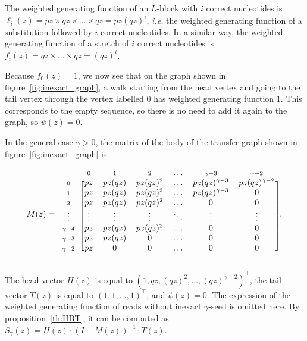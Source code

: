 \documentclass{article}
\begin{document}
The weighted generating function of an $L$-block with $i$ correct
nucleotides is $\ell_i(z) = pz \times qz \times \ldots \times qz =
pz(qz)^i$, \textit{i.e.} the weighted generating function of a
substitution followed by $i$ correct nucleotides. In a similar way, the
weighted generating function of a stretch of $i$ correct nucleotides is
$f_i(z) = qz \times \ldots \times qz = (qz)^i$.

Because $f_0(z) = 1$, we now see that on the graph shown in
figure~\ref{fig:inexact_graph}, a walk starting from the head vertex and
going to the tail vertex through the vertex labelled $0$ has weighted
generating function $1$. This corresponds to the empty sequence, so there
is no need to add it again to the graph, so $\psi(z) = 0$.

In the general case $\gamma > 0$, the matrix of the body of the transfer
graph shown in figure~\ref{fig:inexact_graph} is

\begin{equation*}
M(z) = 
\begin{blockarray}{ccccccc}
       & \scriptstyle{0} & \scriptstyle{1} & \scriptstyle{2} &
    \ldots &  \scriptstyle{\gamma-3} & \scriptstyle{\gamma-2} \\
\begin{block}{c[cccccc]}
\scriptstyle{0} & pz  & pz(qz) & pz(qz)^2 & \ldots &
    pz(qz)^{\gamma-3} & pz(qz)^{\gamma-2} \\
\scriptstyle{1} & pz  & pz(qz) & pz(qz)^2 & \ldots &
    pz(qz)^{\gamma-3} & 0 \\
\scriptstyle{2} & pz  & pz(qz) & pz(qz)^2 & \ldots &
    0 & 0 \\
\vdots & \vdots  & \vdots & \vdots & \ddots & \vdots & \vdots  \\
\scriptstyle{\gamma-4} & pz  & pz(qz) & pz(qz)^2 & \ldots & 0 & 0 \\
\scriptstyle{\gamma-3} & pz  & pz(qz) & 0 & \ldots & 0 & 0 \\
\scriptstyle{\gamma-2} & pz  & 0      & 0 & \ldots & 0 & 0 \\
\end{block}
\end{blockarray}.
\end{equation*}


The head vector $H(z)$ is equal to $(1, qz, (qz)^2, \ldots,
(qz)^{\gamma-2})^\top$, the tail vector $T(z)$ is equal to $(1,1, \ldots,
1)^\top$, and $\psi(z) = 0$. The expression of the weighted generating
function of reads without inexact $\gamma$-seed is omitted here. By
proposition~\ref{th:HBT}, it can be computed as $S_\gamma(z) = H(z) \cdot
(I-M(z))^{-1} \cdot T(z)$.
\end{document}
